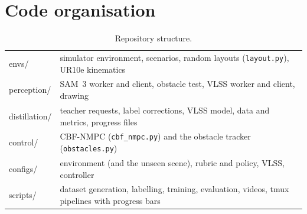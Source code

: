 \documentclass[10pt,a4paper]{article}
\newcommand{\code}[1]{\texttt{#1}}
\begin{document}
\section{Code organisation}
\begin{table}[H]
\centering\footnotesize
\caption{Repository structure.}
\label{tab:repo}
\begin{tabularx}{\textwidth}{>{\ttfamily}l X}
\toprule
envs/ & simulator environment, scenarios, random layouts (\code{layout.py}), UR10e kinematics \\
perception/ & SAM~3 worker and client, obstacle test, VLSS worker and client, drawing \\
distillation/ & teacher requests, label corrections, VLSS model, data and metrics, progress files \\
control/ & CBF-NMPC (\code{cbf\_nmpc.py}) and the obstacle tracker (\code{obstacles.py}) \\
configs/ & environment (and the unseen scene), rubric and policy, VLSS, controller \\
scripts/ & dataset generation, labelling, training, evaluation, videos, tmux pipelines with progress bars \\
\bottomrule
\end{tabularx}
\end{table}
\end{document}

